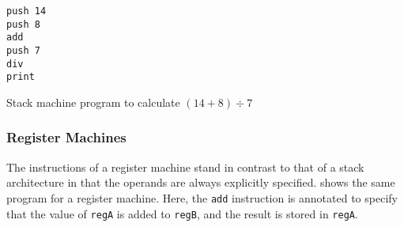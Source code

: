 			\begin{doublefig}
				\begin{halffig}
					\begin{lstlisting}
push 14
push 8
add
push 7
div
print
					\end{lstlisting}
					\caption{Stack machine program to calculate $(14+8)\div7$}
					\label{fig:stackprogram}
				\end{halffig}
			\end{doublefig}
			
			\subsubsection{Register Machines}
			The instructions of a register machine stand in contrast to that of a stack architecture in that the operands are always explicitly specified.  shows the same program for a register machine. Here, the \texttt{add} instruction is annotated to specify that the value of \texttt{regA} is added to \texttt{regB}, and the result is stored in \texttt{regA}.
			
